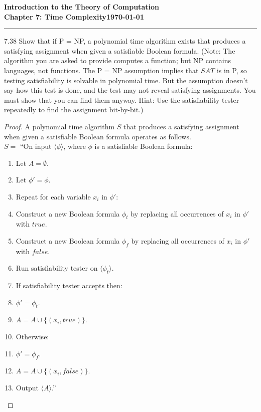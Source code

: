 \documentclass[11pt]{article}
\newcommand{\dated}{\today}
\begin{document}
\textbf{Introduction to the Theory of
Computation}\hfill\textbf{\myname}\\[0.01in]
\textbf{Chapter 7: Time Complexity}\hfill\textbf{\dated}\\
\smallskip\hrule\bigskip

\begin{problem}{7.38}
Show that if P = NP, a polynomial time algorithm exists that produces a satisfying assignment when given a satisfiable Boolean formula. (Note: The algorithm you are asked to provide computes a function; but NP contains languages, not functions. The P = NP assumption implies that $SAT$ is in P, so testing satisfiability is solvable in polynomial time. But the assumption doesn't say how this test is done, and the test may not reveal satisfying assignments. You must show that you can find
them anyway. Hint: Use the satisfiability tester repeatedly to find the assignment bit-by-bit.)
\end{problem}

\begin{proof}
A polynomial time algorithm $S$ that produces a satisfying assignment when given a satisfiable Boolean formula operates as follows. \\

$S =$ \textquotedblleft On input $\langle \phi \rangle$, where $\phi$ is a satisfiable Boolean formula:
\begin{enumerate}
\item Let $A = \emptyset$.
\item Let $\phi' = \phi$.
\item Repeat for each variable $x_i$ in $\phi'$:
\item \hspace*{0.5cm} Construct a new Boolean formula $\phi_t$ by replacing all occurrences of $x_i$ in $\phi'$ with $true$.
\item \hspace*{0.5cm} Construct a new Boolean formula $\phi_f$ by replacing all occurrences of $x_i$ in $\phi'$ with $false$.
\item \hspace*{0.5cm} Run satisfiability tester on $\langle \phi_t \rangle$.
\item \hspace*{0.5cm} If satisfiability tester accepts then:
\item \hspace*{1.0cm} $\phi' = \phi_t$.
\item \hspace*{1.0cm} $A = A \cup \{(x_i, true)\}$.
\item \hspace*{0.5cm} Otherwise:
\item \hspace*{1.0cm} $\phi' = \phi_f$.
\item \hspace*{1.0cm} $A = A \cup \{(x_i, false)\}$.
\item Output $\langle A \rangle$.\textquotedblright
\end{enumerate}
\end{proof}
\end{document}
